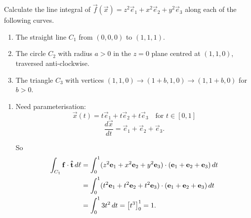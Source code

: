 \documentclass[10pt, a4paper]{article}
\begin{document}
\begin{problem}[$2015$ question $8$]
    Calculate the line integral of $\vec{f}(\vec{x}) = z ^ 2\vec{e}_1 + x ^ 2\vec{e}_2 + y ^ 2\vec{e}_3$ along each of the following curves.

    \begin{enumerate}[label = (\alph*)]
        \item The straight line $C_1$ from $(0, 0, 0)$ to $(1, 1, 1)$.

        \item The circle $C_2$ with radius $a > 0$ in the $z = 0$ plane centred at $(1, 1, 0)$,
        traversed anti-clockwise.

        \item The triangle $C_3$ with vertices $(1, 1, 0) \to (1 + b, 1, 0) \to (1, 1 + b, 0)$ for $b > 0$.
    \end{enumerate}

    \begin{solution}
        \begin{enumerate}[label = (\alph*)]
            \item Need parameterisation:
            \[
            \vec{x}(t) = t\vec{e}_1 + t\vec{e}_2 + t\vec{e}_3\quad\text{for } t \in [0, 1]
            \]
            \[
            \frac{d\vec{x}}{dt} = \vec{e}_1 + \vec{e}_2 + \vec{e}_3.
            \]

            So
            \begin{align*}
                \int_{C_1}\mathbf{f}\cdot\mathbf{\hat{t}}\,d\ell &= \int_{0}^{1}(z ^ 2\mathbf{e}_1 + x ^ 2\mathbf{e}_2 + y ^ 2\mathbf{e}_3)\cdot(\mathbf{e}_1 + \mathbf{e}_2 + \mathbf{e}_3)\,dt \\
                &= \int_{0}^{1}(t ^ 2\mathbf{e}_1 + t ^ 2\mathbf{e}_2 + t ^ 2\mathbf{e}_3) \cdot (\mathbf{e}_1 + \mathbf{e}_2 + \mathbf{e}_3)\,dt \\
                &= \int_{0}^{1}3t ^ 2\,dt = \left[t ^ 3\right]_{0}^{1} = 1.
            \end{align*}


\end{enumerate}
\end{solution}
\end{problem}
\end{document}

